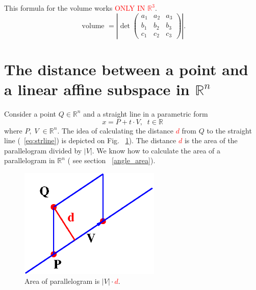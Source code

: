 \documentclass[color=black,11pt]{elegantpaper}
\begin{document}
This formula for the volume works \textcolor{red}{ONLY IN $\mathbb{R}^3$}.
$$
\mbox{ volume } = |\det \left( \begin{array}{ccc}
                                        a_1 & a_2 & a_3\\
                                        b_1 & b_2 & b_3\\
                                        c_1 & c_2 & c_3
                                        \end{array} \right) |.
$$


\section{The distance between a point and a linear affine subspace in $\mathbb{R}^n$}
Consider a point $Q \in \mathbb{R}^n$ and a straight line in a parametric form
\begin{equation}
\label{eq:strline}
x = P + t\cdot V,\;\;t \in \mathbb{R}
\end{equation}
where $P,\;V \; \in \mathbb{R}^n.$ The idea of calculating the distance \textcolor{red}{$d$} from $Q$ to the straight line (~\ref{eq:strline}) is depicted on Fig. ~\ref{fig:distancePointLine}). The distance \textcolor{red}{$d$} is the area of the parallelogram divided by $|V|.$ We know how to calculate the area of a parallelogram in $\mathbb{R}^n$ ( see section ~\ref{angle_area}).
\begin{figure}[htbp]
  \centering
  \includegraphics[width=0.6\textwidth]{xfig_stuff/distancePointLine.eps}
  \caption{Area of parallelogram is $|V|\cdot$\textcolor{red}{$ d$}.}
  \label{fig:distancePointLine}
\end{figure}
\end{document}
